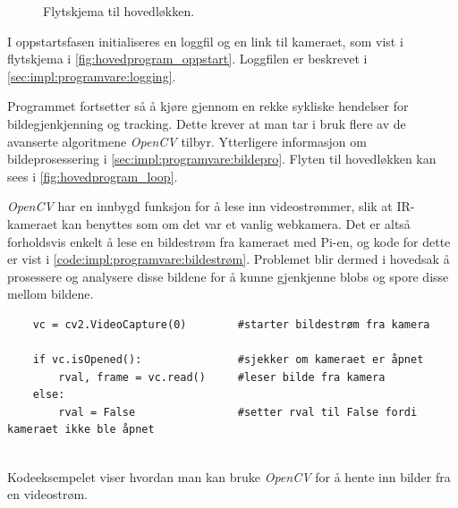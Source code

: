\begin{figure}[!htbp]
\begin{minipage}[b]{0.3\textwidth}
    \caption{Flytskjema til hovedløkken.}
    \label{fig:hovedprogram_loop}
\end{minipage}
\end{figure}


I oppstartsfasen initialiseres en loggfil og en link til kameraet, som vist i flytskjema i \autoref{fig:hovedprogram_oppstart}. Loggfilen er beskrevet i \autoref{sec:impl:programvare:logging}.


Programmet fortsetter så å kjøre gjennom en rekke sykliske hendelser for bildegjenkjenning og tracking. 
Dette krever at man tar i bruk flere av de avanserte algoritmene \textit{OpenCV} tilbyr.
Ytterligere informasjon om bildeprosessering i \autoref{sec:impl:programvare:bildepro}. 
Flyten til hovedløkken kan sees i \autoref{fig:hovedprogram_loop}.


\textit{OpenCV} har en innbygd funksjon for å lese inn videostrømmer, slik at IR-kameraet kan benyttes som om det var et vanlig webkamera. 
Det er altså forholdsvis enkelt å lese en bildestrøm fra kameraet med Pi-en, og kode for dette er vist i \autoref{code:impl:programvare:bildestrøm}. 
Problemet blir dermed i hovedsak å prosessere og analysere disse bildene for å kunne gjenkjenne blobs og spore disse mellom bildene.

\begin{listing}[!htb]
\begin{verbatim}
    vc = cv2.VideoCapture(0)        #starter bildestrøm fra kamera
    
    if vc.isOpened():               #sjekker om kameraet er åpnet
        rval, frame = vc.read()     #leser bilde fra kamera
    else:
        rval = False                #setter rval til False fordi kameraet ikke ble åpnet 
    
\end{verbatim}
\caption{Kodeeksempelet viser hvordan man kan bruke \textit{OpenCV} for å hente inn bilder fra en videostrøm.}
\label{code:impl:programvare:bildestrøm}
\end{listing}



